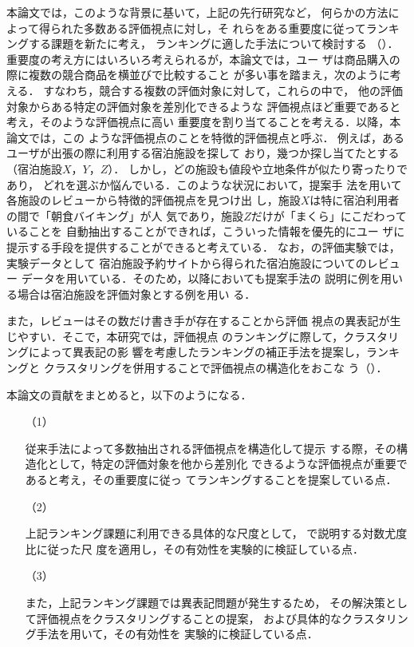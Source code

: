 \documentclass[japanese]{jnlp_1.4}
\def\sec#1{}
\begin{document}
本論文では，このような背景に基いて，上記の先行研究など，
何らかの方法によって得られた多数ある評価視点に対し，そ
れらをある重要度に従ってランキングする課題を新たに考え，
ランキングに適した手法について検討する
（\sec{uniq_aspect_ranking}）．
重要度の考え方にはいろいろ考えられるが，本論文では，ユー
ザは商品購入の際に複数の競合商品を横並びで比較すること
が多い事を踏まえ，次のように考える．
すなわち，競合する複数の評価対象に対して，これらの中で，
他の評価対象からある特定の評価対象を差別化できるような
評価視点ほど重要であると考え，そのような評価視点に高い
重要度を割り当てることを考える．以降，本論文では，この
ような評価視点のことを特徴的評価視点と呼ぶ．
例えば，あるユーザが出張の際に利用する宿泊施設を探して
おり，幾つか探し当てたとする（宿泊施設$X$，$Y$，$Z$）．
しかし，どの施設も値段や立地条件が似たり寄ったりであり，
どれを選ぶか悩んでいる．このような状況において，提案手
法を用いて各施設のレビューから特徴的評価視点を見つけ出
し，施設$X$は特に宿泊利用者の間で「朝食バイキング」が人
気であり，施設$Z$だけが「まくら」にこだわっていることを
自動抽出することができれば，こういった情報を優先的にユー
ザに提示する手段を提供することができると考えている．
なお，\sec{experiment}の評価実験では，実験データとして
宿泊施設予約サイトから得られた宿泊施設についてのレビュー
データを用いている．そのため，以降においても提案手法の
説明に例を用いる場合は宿泊施設を評価対象とする例を用い
る．

また，レビューはその数だけ書き手が存在することから評価
視点の異表記が生じやすい．そこで，本研究では，評価視点
のランキングに際して，クラスタリングによって異表記の影
響を考慮したランキングの補正手法を提案し，ランキングと
クラスタリングを併用することで評価視点の構造化をおこな
う（\sec{cl}）．


本論文の貢献をまとめると，以下のようになる．

\begin{itemize}
\item[（1）]

従来手法によって多数抽出される評価視点を構造化して提示
する際，その構造化として，特定の評価対象を他から差別化
できるような評価視点が重要であると考え，その重要度に従っ
てランキングすることを提案している点．

\item[（2）]

上記ランキング課題に利用できる具体的な尺度として，
\sec{uniq_aspect_ranking}で説明する対数尤度比に従った尺
度を適用し，その有効性を実験的に検証している点．

\item[（3）]

また，上記ランキング課題では異表記問題が発生するため，
その解決策として評価視点をクラスタリングすることの提案，
および具体的なクラスタリング手法を用いて，その有効性を
実験的に検証している点．
\end{itemize}
\end{document}
